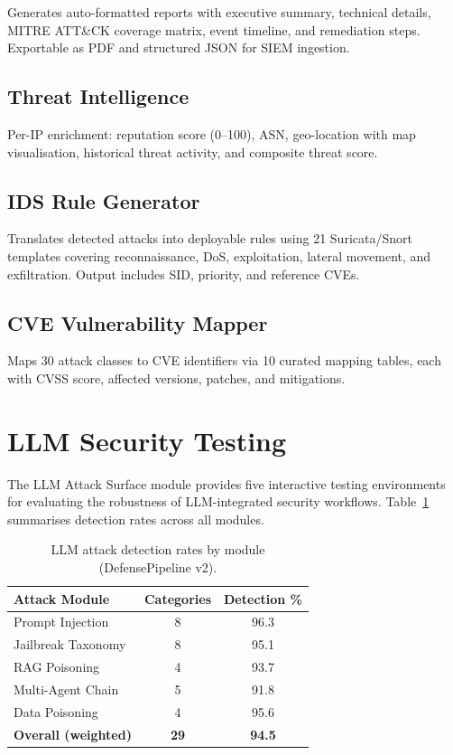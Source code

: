 Generates auto-formatted reports with executive summary, technical details, MITRE ATT\&CK coverage matrix, event timeline, and remediation steps.  Exportable as PDF and structured JSON for SIEM ingestion.

\subsection{Threat Intelligence}
\label{sec:threat_intel}

Per-IP enrichment: reputation score (0--100), ASN, geo-location with map visualisation, historical threat activity, and composite threat score.

\subsection{IDS Rule Generator}
\label{sec:rule_generator}

Translates detected attacks into deployable rules using 21 Suricata/Snort templates covering reconnaissance, DoS, exploitation, lateral movement, and exfiltration.  Output includes SID, priority, and reference CVEs.

\subsection{CVE Vulnerability Mapper}
\label{sec:cve_mapper}

Maps 30 attack classes to CVE identifiers via 10 curated mapping tables, each with CVSS score, affected versions, patches, and mitigations.

\section{LLM Security Testing}
\label{sec:llm_security}

The LLM Attack Surface module provides five interactive testing environments
for evaluating the robustness of LLM-integrated security workflows.
Table~\ref{tab:llm_detection} summarises detection rates across all modules.

\begin{table}[t]
\centering
\caption{LLM attack detection rates by module (DefensePipeline v2).}
\label{tab:llm_detection}
\begin{tabular}{@{}lcc@{}}
\toprule
\textbf{Attack Module} & \textbf{Categories} & \textbf{Detection \%} \\
\midrule
Prompt Injection        & 8  & 96.3 \\
Jailbreak Taxonomy      & 8  & 95.1 \\
RAG Poisoning           & 4  & 93.7 \\
Multi-Agent Chain       & 5  & 91.8 \\
Data Poisoning          & 4  & 95.6 \\
\midrule
\textbf{Overall (weighted)} & \textbf{29} & \textbf{94.5} \\
\bottomrule
\end{tabular}
\end{table}

